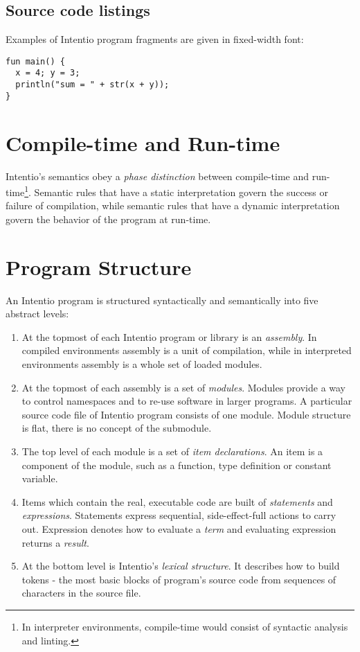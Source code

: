 \subsection*{Source code listings}

Examples of Intentio program fragments are given in fixed-width font:

\begin{lstlisting}
fun main() {
  x = 4; y = 3;
  println("sum = " + str(x + y));
}
\end{lstlisting}


\section{Compile-time and Run-time}

Intentio's semantics obey a \emph{phase distinction} between compile-time and run-time\footnote{In interpreter environments, compile-time would consist of syntactic analysis and linting.}. Semantic rules that have a static interpretation govern the success or failure of compilation, while semantic rules that have a dynamic interpretation govern the behavior of the program at run-time.


\section{Program Structure}

An Intentio program is structured syntactically and semantically into five abstract levels:

\begin{enumerate}
  \item At the topmost of each Intentio program or library is an \emph{assembly}. In compiled environments assembly is a unit of compilation, while in interpreted environments assembly is a whole set of loaded modules.
  \item At the topmost of each assembly is a set of \emph{modules}. Modules provide a way to control namespaces and to re-use software in larger programs. A particular source code file of Intentio program consists of one module. Module structure is flat, there is no concept of the submodule.
  \item The top level of each module is a set of \emph{item declarations}. An item is a component of the module, such as a function, type definition or constant variable.
  \item Items which contain the real, executable code are built of \emph{statements} and \emph{expressions}. Statements express sequential, side-effect-full actions to carry out. Expression denotes how to evaluate a \emph{term} and evaluating expression returns a \emph{result}.
  \item At the bottom level is Intentio's \emph{lexical structure}. It describes how to build tokens - the most basic blocks of program's source code from sequences of characters in the source file.
\end{enumerate}


